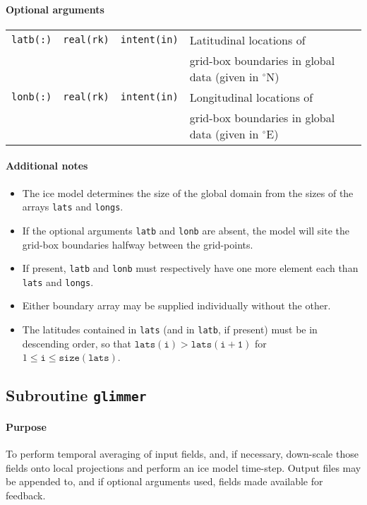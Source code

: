 \paragraph{Optional arguments}
%
\begin{center}
\begin{tabular}{llll}
\texttt{latb(:)} & \texttt{real(rk)} & \texttt{intent(in)} & Latitudinal
locations of  \\
 & & & grid-box boundaries in global data (given in $^{\circ}\mathrm{N}$)\\
\texttt{lonb(:)} & \texttt{real(rk)} & \texttt{intent(in)} & Longitudinal
locations of  \\
 & & & grid-box boundaries in global data (given in $^{\circ}\mathrm{E}$)\\
\end{tabular}
\end{center}

\paragraph{Additional notes}
%
\begin{itemize}
\item The ice model determines the size of the global domain from the sizes of
  the arrays \texttt{lats} and \texttt{longs}.
\item If the optional arguments \texttt{latb} and \texttt{lonb} are absent,
  the model will site the grid-box boundaries halfway between the
  grid-points. 
\item If present, \texttt{latb} and \texttt{lonb} must respectively have one more
  element each than \texttt{lats} and \texttt{longs}.
\item Either boundary array may be supplied individually without the other.
\item The latitudes contained in \texttt{lats} (and in \texttt{latb}, if
  present) must be in descending order, so
  that $\mathtt{lats(i)}>\mathtt{lats(i+1)}$ for $1\leq \mathtt{i} \leq
  \mathtt{size(lats)}$.
\end{itemize}
%
\subsection{Subroutine \texttt{glimmer}}
%
\paragraph{Purpose}
%
To perform temporal averaging of input fields, and, if necessary, down-scale
those fields onto local projections and perform an ice model time-step. Output
files may be appended to, and if optional arguments used, fields made
available for feedback.
%
